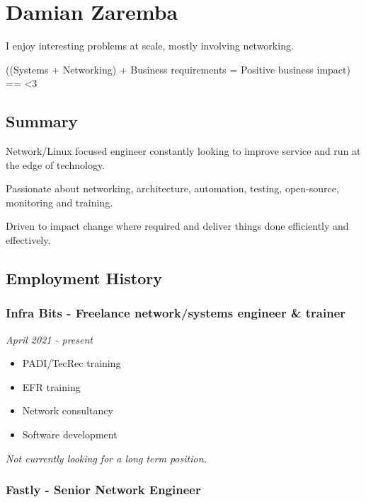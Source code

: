 \hypertarget{damian-zaremba}{%
\section{Damian Zaremba}\label{damian-zaremba}}

I enjoy interesting problems at scale, mostly involving networking.

((Systems + Networking) + Business requirements = Positive business
impact) == \textless{}3

\hypertarget{summary}{%
\subsection{Summary}\label{summary}}

Network/Linux focused engineer constantly looking to improve service and
run at the edge of technology.

Passionate about networking, architecture, automation, testing,
open-source, monitoring and training.

Driven to impact change where required and deliver things done
efficiently and effectively.

\hypertarget{employment-history}{%
\subsection{Employment History}\label{employment-history}}

\hypertarget{infra-bits---freelance-networksystems-engineer-trainer}{%
\subsubsection{Infra Bits - Freelance network/systems engineer \&
trainer}\label{infra-bits---freelance-networksystems-engineer-trainer}}

\emph{April 2021 - present}

\begin{itemize}
\tightlist
\item
  PADI/TecRec training
\item
  EFR training
\item
  Network consultancy
\item
  Software development
\end{itemize}

\emph{Not currently looking for a long term position.}

\hypertarget{fastly---senior-network-engineer}{%
\subsubsection{Fastly - Senior Network
Engineer}\label{fastly---senior-network-engineer}}

